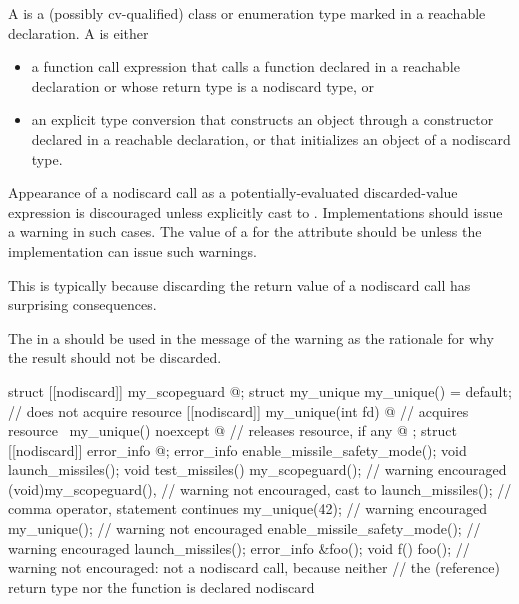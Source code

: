 \pnum
A  is
a (possibly cv-qualified) class or enumeration type
marked  in a reachable declaration.
A  is either
\begin{itemize}
\item
  a function call expression
  that calls a function declared  in a reachable declaration or
  whose return type is a nodiscard type, or
\item
  an explicit type
  conversion
  that constructs an object through
  a constructor declared  in a reachable declaration, or
  that initializes an object of a nodiscard type.
\end{itemize}

\pnum
\recommended
Appearance of a nodiscard call as
a potentially-evaluated discarded-value expression
is discouraged unless explicitly cast to .
Implementations should issue a warning in such cases.
The value of
a  for the  attribute
should be  unless the implementation can issue such warnings.
\begin{note}
This is typically because discarding the return value
of a nodiscard call has surprising consequences.
\end{note}
The 
in a  
should be used in the message of the warning
as the rationale for why the result should not be discarded.

\pnum
\begin{example}
\begin{codeblock}
struct [[nodiscard]] my_scopeguard { @\commentellip@ };
struct my_unique {
  my_unique() = default;                                // does not acquire resource
  [[nodiscard]] my_unique(int fd) { @\commentellip@ }         // acquires resource
  ~my_unique() noexcept { @\commentellip@ }                   // releases resource, if any
  @\commentellip@
};
struct [[nodiscard]] error_info { @\commentellip@ };
error_info enable_missile_safety_mode();
void launch_missiles();
void test_missiles() {
  my_scopeguard();              // warning encouraged
  (void)my_scopeguard(),        // warning not encouraged, cast to 
    launch_missiles();          // comma operator, statement continues
  my_unique(42);                // warning encouraged
  my_unique();                  // warning not encouraged
  enable_missile_safety_mode(); // warning encouraged
  launch_missiles();
}
error_info &foo();
void f() { foo(); }             // warning not encouraged: not a nodiscard call, because neither
                                // the (reference) return type nor the function is declared nodiscard
\end{codeblock}
\end{example}

